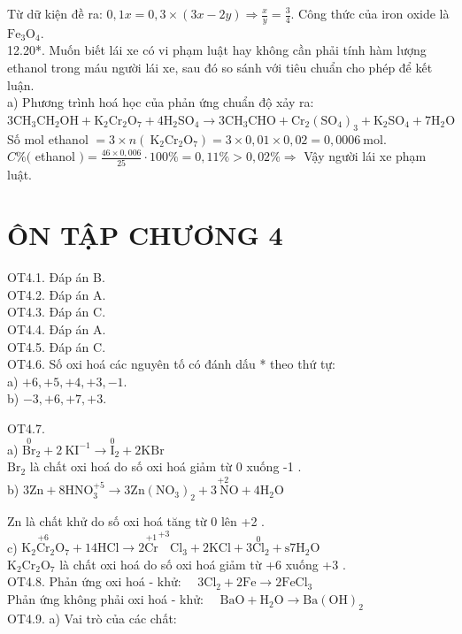 \documentclass[10pt]{article}
\begin{document}
Từ dữ kiện đề ra: $0,1 x=0,3 \times(3 x-2 y) \Rightarrow \frac{x}{y}=\frac{3}{4}$. Công thức của iron oxide là $\mathrm{Fe}_{3} \mathrm{O}_{4}$.\\
12.20*. Muốn biết lái xe có vi phạm luật hay không cần phải tính hàm lượng ethanol trong máu người lái xe, sau đó so sánh với tiêu chuẩn cho phép để kết luận.\\
a) Phương trình hoá học của phản ứng chuẩn độ xảy ra:\\
$3 \mathrm{CH}_{3} \mathrm{CH}_{2} \mathrm{OH}+\mathrm{K}_{2} \mathrm{Cr}_{2} \mathrm{O}_{7}+4 \mathrm{H}_{2} \mathrm{SO}_{4} \rightarrow 3 \mathrm{CH}_{3} \mathrm{CHO}+\mathrm{Cr}_{2}\left(\mathrm{SO}_{4}\right)_{3}+\mathrm{K}_{2} \mathrm{SO}_{4}+7 \mathrm{H}_{2} \mathrm{O}$\\
Số mol ethanol $=3 \times n\left(\mathrm{~K}_{2} \mathrm{Cr}_{2} \mathrm{O}_{7}\right)=3 \times 0,01 \times 0,02=0,0006 \mathrm{~mol}$.\\
$C \%($ ethanol $)=\frac{46 \times 0,006}{25} \cdot 100 \%=0,11 \%>0,02 \% \Rightarrow$ Vậy người lái xe phạm luật.

\section*{ÔN TẬP CHƯƠNG 4}
OT4.1. Đáp án B.\\
OT4.2. Đáp án A.\\
OT4.3. Đáp án C.\\
OT4.4. Đáp án A.\\
OT4.5. Đáp án C.\\
OT4.6. Số oxi hoá các nguyên tố có đánh dấu * theo thứ tự:\\
a) $+6,+5,+4,+3,-1$.\\
b) $-3,+6,+7,+3$.

OT4.7.\\
a) $\stackrel{0}{\mathrm{Br}}{ }_{2}+2 \mathrm{~K} \mathrm{I}^{-1} \rightarrow \stackrel{0}{\mathrm{I}}_{2}+2 \mathrm{KBr}$\\
$\mathrm{Br}_{2}$ là chất oxi hoá do số oxi hoá giảm từ 0 xuống -1 .\\
b) $3 \mathrm{Zn}+8 \mathrm{HNO}_{3}^{+5} \rightarrow 3 \mathrm{Zn}\left(\mathrm{NO}_{3}\right)_{2}+3 \stackrel{+2}{\mathrm{~N}} \mathrm{O}+4 \mathrm{H}_{2} \mathrm{O}$

Zn là chất khử do số oxi hoá tăng từ 0 lên +2 .\\
c) $\mathrm{K}_{2} \stackrel{+6}{\mathrm{Cr}}_{2} \mathrm{O}_{7}+14 \mathrm{HCl} \rightarrow 2 \stackrel{+1}{\mathrm{Cr}}^{+3} \mathrm{Cl}_{3}+2 \mathrm{KCl}+3 \stackrel{0}{\mathrm{Cl}}_{2}+\mathrm{s} 7 \mathrm{H}_{2} \mathrm{O}$\\
$\mathrm{K}_{2} \mathrm{Cr}_{2} \mathrm{O}_{7}$ là chất oxi hoá do số oxi hoá giảm từ +6 xuống +3 .\\
OT4.8. Phản ứng oxi hoá - khử: $\quad 3 \mathrm{Cl}_{2}+2 \mathrm{Fe} \rightarrow 2 \mathrm{FeCl}_{3}$\\
Phản ứng không phải oxi hoá - khử: $\quad \mathrm{BaO}+\mathrm{H}_{2} \mathrm{O} \rightarrow \mathrm{Ba}(\mathrm{OH})_{2}$\\
OT4.9. a) Vai trò của các chất:
\end{document}
